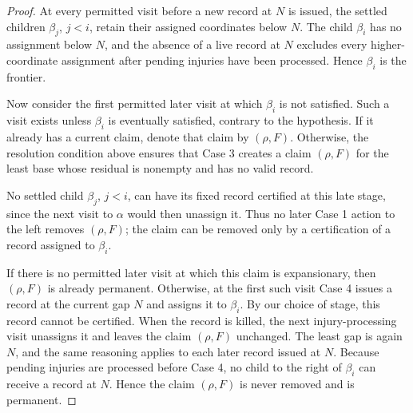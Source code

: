\documentclass[10pt,a4paper]{amsart}
\begin{document}
\begin{proof}
At every permitted visit before a new record at $N$ is issued, the settled
children $\beta_j$, $j<i$, retain their assigned coordinates below $N$. The
child $\beta_i$ has no assignment below $N$, and the absence of a live record
at $N$ excludes every higher-coordinate assignment after pending injuries
have been processed. Hence $\beta_i$ is the frontier.

Now consider the first permitted later visit at which $\beta_i$ is not
satisfied. Such a visit exists unless $\beta_i$ is eventually satisfied,
contrary to the hypothesis. If it already has a current claim, denote that
claim by $(\rho,F)$. Otherwise, the resolution condition above ensures that
Case 3 creates a claim $(\rho,F)$ for the least base whose residual is
nonempty and has no valid record.

No settled child $\beta_j$, $j<i$, can have its fixed record certified at
this late stage, since the next visit to $\alpha$ would then unassign it.
Thus no later Case 1 action to the left removes $(\rho,F)$; the claim can be
removed only by a certification of a record assigned to $\beta_i$.

If there is no permitted later visit at which this claim is expansionary,
then $(\rho,F)$ is already permanent. Otherwise, at the first such visit
Case 4 issues a record at the current gap $N$ and assigns it to $\beta_i$.
By our choice of stage, this record cannot be certified. When the record is
killed, the next injury-processing visit unassigns it and leaves the claim
$(\rho,F)$ unchanged. The least gap is again $N$, and the same reasoning
applies to each later record issued at $N$. Because pending injuries are
processed before Case 4, no child to the right of $\beta_i$ can receive a
record at $N$. Hence the claim $(\rho,F)$ is never removed and is permanent.
\end{proof}
\end{document}
